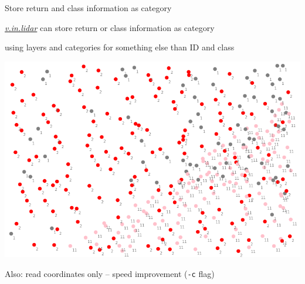 \documentclass[xcolor={dvipsnames,usenames},beamer,aspectratio=169]{beamer}
\newcommand{\gmodule}[1]{\href{http://grass.osgeo.org/grass71/manuals/#1.html}{\emph{#1}}}
\begin{document}
\begin{frame}{Store return and class information as category}

\gmodule{v.in.lidar} can store return or class information as category

{\small using layers and categories for something else than ID and class}


\begin{center}
\includegraphics[height=0.6\textheight]{images/features/class_as_cat}
\end{center}

Also: read coordinates only -- speed improvement (\texttt{-c} flag)

\end{frame}
\end{document}
